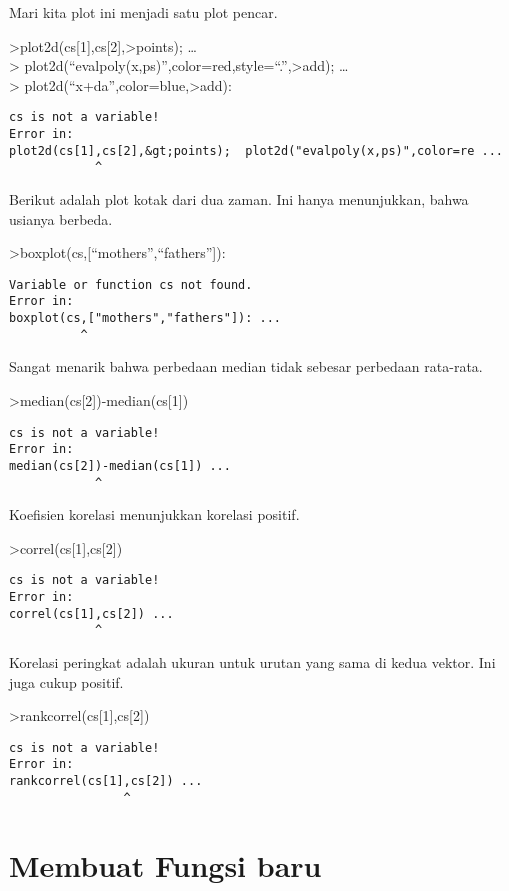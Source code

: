 \documentclass[
]{book}
\begin{document}
Mari kita plot ini menjadi satu plot pencar.

\textgreater plot2d(cs{[}1{]},cs{[}2{]},\textgreater points); \ldots{}\\
\textgreater{} plot2d(``evalpoly(x,ps)'',color=red,style=``.'',\textgreater add); \ldots{}\\
\textgreater{} plot2d(``x+da'',color=blue,\textgreater add):

\begin{verbatim}
cs is not a variable!
Error in:
plot2d(cs[1],cs[2],&gt;points);  plot2d("evalpoly(x,ps)",color=re ...
            ^
\end{verbatim}

Berikut adalah plot kotak dari dua zaman. Ini hanya menunjukkan, bahwa usianya berbeda.

\textgreater boxplot(cs,{[}``mothers'',``fathers''{]}):

\begin{verbatim}
Variable or function cs not found.
Error in:
boxplot(cs,["mothers","fathers"]): ...
          ^
\end{verbatim}

Sangat menarik bahwa perbedaan median tidak sebesar perbedaan rata-rata.

\textgreater median(cs{[}2{]})-median(cs{[}1{]})

\begin{verbatim}
cs is not a variable!
Error in:
median(cs[2])-median(cs[1]) ...
            ^
\end{verbatim}

Koefisien korelasi menunjukkan korelasi positif.

\textgreater correl(cs{[}1{]},cs{[}2{]})

\begin{verbatim}
cs is not a variable!
Error in:
correl(cs[1],cs[2]) ...
            ^
\end{verbatim}

Korelasi peringkat adalah ukuran untuk urutan yang sama di kedua vektor. Ini juga cukup positif.

\textgreater rankcorrel(cs{[}1{]},cs{[}2{]})

\begin{verbatim}
cs is not a variable!
Error in:
rankcorrel(cs[1],cs[2]) ...
                ^
\end{verbatim}

\chapter{Membuat Fungsi baru}\label{membuat-fungsi-baru}
\end{document}

